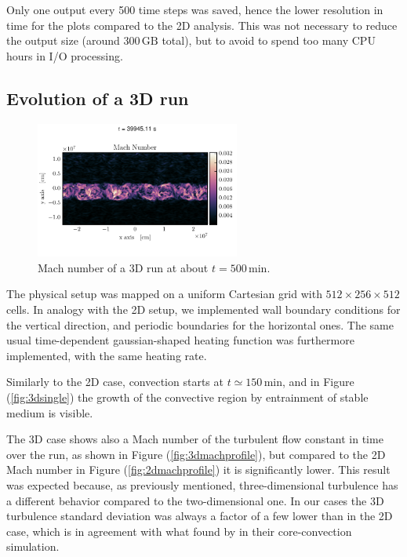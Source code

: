  Only one output every 500 time steps was saved, hence the lower resolution in time for the plots compared to the 2D analysis. This was not necessary to reduce the output size (around $300 \, \mathrm{GB}$ total), but to avoid to spend too many CPU hours in I/O processing.
\subsection{Evolution of a 3D run}

\begin{figure}[t!]
\centering
\includegraphics[width=0.6\textwidth]{./img/3dmach.pdf}
\caption{Mach number of a 3D run at about $t=500 \, \mathrm{min}$.}
\label{fig:3dmach}
\end{figure}

The physical setup was mapped on a uniform Cartesian grid with $512 \times 256 \times 512$ cells. In analogy with the 2D setup, we implemented wall boundary conditions for the vertical direction, and periodic boundaries for the horizontal ones. The same usual time-dependent gaussian-shaped heating function was furthermore implemented, with the same heating rate.

Similarly to the 2D case, convection starts at $t \simeq 150 \, \mathrm{min}$, and in Figure (\ref{fig:3dsingle}) the growth of the convective region by entrainment of stable medium is visible.

The 3D case shows also a Mach number of the turbulent flow constant in time over the run, as shown in Figure (\ref{fig:3dmachprofile}), but compared to the 2D Mach number in Figure (\ref{fig:2dmachprofile}) it is significantly lower. This result was expected because, as previously mentioned, three-dimensional turbulence has a different behavior compared to the two-dimensional one. In our cases the 3D turbulence standard deviation was always a factor of a few lower than in the 2D case, which is in agreement with what found by \citet{meakin} in their core-convection simulation. 


